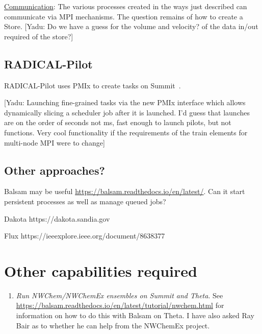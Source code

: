 \documentclass[10pt]{article}
\newcommand\yadu[1]{{\color{red}[Yadu: #1]}}
\begin{document}
\underline{Communication}: The various processes created in the ways just described can communicate via MPI mechanisms.
The question remains of how to create a Store.
\yadu{Do we have a guess for the volume and velocity? of the data in/out required of the store?}

\subsection{RADICAL-Pilot}

RADICAL-Pilot uses PMIx to create tasks on Summit~\cite{turilli2019characterizing}.

\yadu{Launching fine-grained tasks via the new PMIx interface which allows dynamically slicing a scheduler job after it is launched. I'd guess that launches are on the order of seconds not ms, fast enough to launch pilots, but not functions. Very cool functionality if the requirements of the train elements for multi-node MPI were to change}


\subsection{Other approaches?}

Balsam may be useful \url{https://balsam.readthedocs.io/en/latest/}.
Can it start persistent processes as well as manage queued jobs?

Dakota https://dakota.sandia.gov

Flux https://ieeexplore.ieee.org/document/8638377

\section{Other capabilities required}

\begin{enumerate}
    \item 
    \emph{Run NWChem/NWChemEx ensembles on Summit and Theta}.
    See \url{https://balsam.readthedocs.io/en/latest/tutorial/nwchem.html} for information on how to do this with Balsam on Theta.
    I have also asked Ray Bair as to whether he can help from the NWChemEx project.
\end{enumerate}




\appendix
\appendixpage
\end{document}
